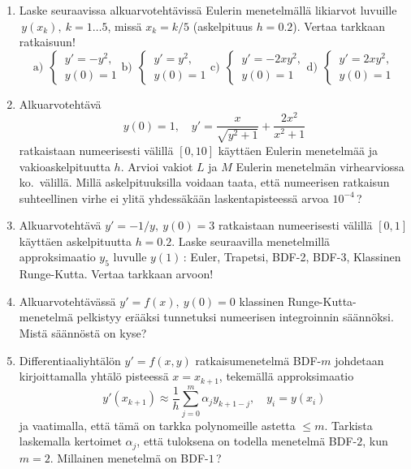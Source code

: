 \Harj
\begin{enumerate}

\item \label{H-dy-7: Euler-kokeita} 
Laske seuraavissa alkuarvotehtävissä Eulerin menetelmällä likiarvot luvuille 
$\,y(x_k),\ k=1 \ldots 5$, missä $x_k=k/5$ (askelpituus $h=0.2$). Vertaa tarkkaan ratkaisuun!
\[
\text{a)}\ \ \begin{cases} \,y'=-y^2, \\ \,y(0)=1 \end{cases}
\text{b)}\ \ \begin{cases} \,y'=y^2, \\ \,y(0)=1 \end{cases}
\text{c)}\ \ \begin{cases} \,y'=-2xy^2, \\ \,y(0)=1 \end{cases}
\text{d)}\ \ \begin{cases} \,y'=2xy^2, \\ \,y(0)=1 \end{cases}
\]

\item
Alkuarvotehtävä
\[
y(0)=1, \quad y'=\frac{x}{\sqrt{y^2+1}}+\frac{2x^2}{x^2+1}
\]
ratkaistaan numeerisesti välillä $[0,10]$ käyttäen Eulerin menetelmää ja vakioaskelpituutta $h$.
Arvioi vakiot $L$ ja $M$ Eulerin menetelmän virhearviossa ko.\ välillä. Millä askelpituuksilla
voidaan taata, että numeerisen ratkaisun suhteellinen virhe ei ylitä yhdessäkään
laskentapisteessä arvoa $10^{-4}\,$?

\item
Alkuarvotehtävä $y'=-1/y,\ y(0)=3$ ratkaistaan numeerisesti välillä $[0,1]$ käyttäen
askelpituutta $h=0.2$. Laske seuraavilla menetelmillä approksimaatio $y_5$ luvulle
$y(1)\,$: Euler, Trapetsi, BDF-2, BDF-3, Klassinen Runge-Kutta. Vertaa tarkkaan arvoon!

\item
Alkuarvotehtävässä $y'=f(x),\ y(0)=0$ klassinen Runge-Kutta-menetelmä pelkistyy erääksi
tunnetuksi numeerisen integroinnin säännöksi. Mistä säännöstä on kyse?

\item \label{H-dy-7: BDF}
Differentiaaliyhtälön $y'=f(x,y)$ ratkaisumenetelmä BDF-$m$ johdetaan kirjoittamalla yhtälö
pisteessä $x=x_{k+1}$, tekemällä approksimaatio
\[
y'(x_{k+1}) \approx \frac{1}{h} \sum_{j=0}^m \alpha_j y_{k+1-j}, \quad y_i=y(x_i) 
\]
ja vaatimalla, että tämä on tarkka polynomeille astetta $\le m$. Tarkista laskemalla kertoimet
$\alpha_j$, että tuloksena on todella menetelmä BDF-$2$, kun $m=2$. Millainen menetelmä on 
BDF-$1\,$?


\end{enumerate}
